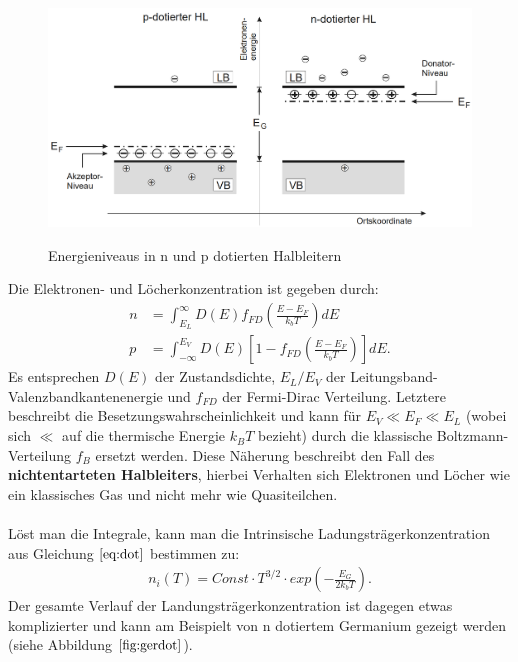 \begin{figure}
    \centering
    \caption{Energieniveaus in n und p dotierten Halbleitern}
    \includegraphics[width=1.0\textwidth]{./fig/hl_dot.png}
    \label{fig:hle}
\end{figure}
Die Elektronen- und Löcherkonzentration ist gegeben durch:
\begin{align}
    n &= \int^{\infty}_{E_L} D(E) f_{FD}\left (\frac{E-E_F}{k_b T} \right) dE \\
    p &= \int_{-\infty}^{E_V} D(E) \left[1-f_{FD}\left (\frac{E-E_F}{k_b T} \right)\right] dE.
\end{align}
Es entsprechen $D(E)$ der Zustandsdichte, $E_L / E_V$ der Leitungsband- Valenzbandkantenenergie und $f_{FD}$ der Fermi-Dirac Verteilung. Letztere beschreibt die Besetzungswahrscheinlichkeit und kann für $E_V \ll E_F \ll E_L$ (wobei sich $\ll$ auf die thermische Energie $k_B T$ bezieht) durch die klassische Boltzmann-Verteilung $f_B$ ersetzt werden. Diese Näherung beschreibt den Fall des \textbf{nichtentarteten Halbleiters}, hierbei Verhalten sich Elektronen und Löcher wie ein klassisches Gas und nicht mehr wie Quasiteilchen. \\
\\
Löst man die Integrale, kann man die Intrinsische Ladungsträgerkonzentration aus Gleichung $\autoref{eq:dot}$ bestimmen zu:
\begin{align}
    n_i(T) = Const \cdot T^{3/2} \cdot exp \left (-\frac{E_G}{2k_bT} \right ).
\end{align}
Der gesamte Verlauf der Landungsträgerkonzentration ist dagegen etwas komplizierter und kann am Beispielt von n dotiertem Germanium gezeigt werden (siehe Abbildung $\autoref{fig:gerdot}$).

